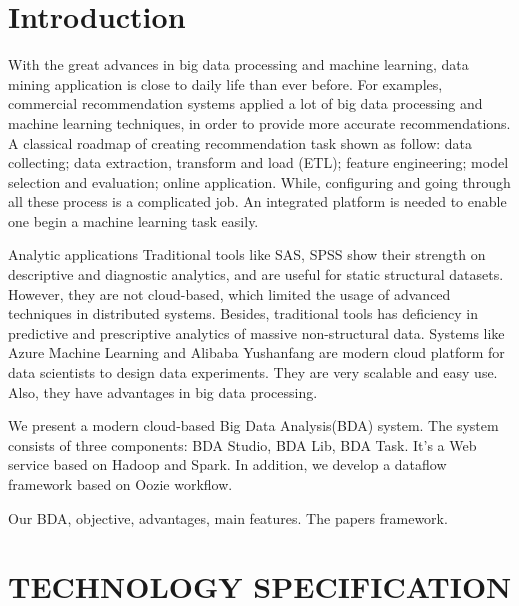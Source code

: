 \documentclass{sig-alternate-05-2015}
\begin{document}


%
%

%
%
\printccsdesc



\section{Introduction}
With the great advances in big data processing and machine learning, data mining application is close to daily life than ever before. For examples, commercial recommendation systems applied a lot of big data processing and machine learning techniques, in order to provide more accurate recommendations. A classical roadmap of creating recommendation task shown as follow: data collecting; data extraction, transform and load (ETL); feature engineering; model selection and evaluation; online application. While, configuring and going through all these process is a complicated job. An integrated platform is needed to enable one begin a machine learning task easily.

Analytic applications  Traditional tools like SAS, SPSS show their strength on descriptive and diagnostic analytics, and are useful for static structural datasets. However, they are not cloud-based, which limited the usage of advanced techniques in distributed systems. Besides, traditional tools has deficiency in predictive and prescriptive analytics of massive non-structural data. Systems like Azure Machine Learning and Alibaba Yushanfang are modern cloud platform for data scientists to design data experiments. They are very scalable and easy use. Also, they have advantages in big data processing. 

We present a modern cloud-based Big Data Analysis(BDA) system. The system consists of three components: BDA Studio, BDA Lib, BDA Task. It's a Web service based on Hadoop and Spark. In addition, we develop a dataflow framework based on Oozie workflow.

Our BDA, objective, advantages, main features.
The papers framework.


\section{TECHNOLOGY SPECIFICATION}
\end{document}
